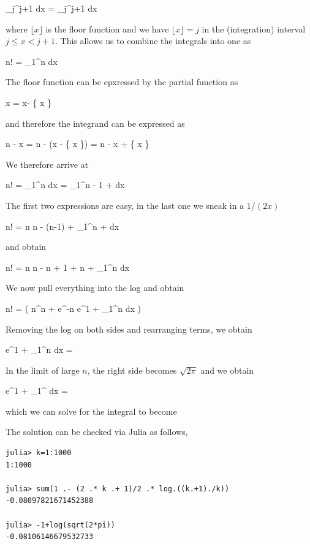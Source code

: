 \bee
\int_{j}^{j+1} dx = \int_{j}^{j+1} dx
\eee

where $\lfloor x \rfloor$ is the floor function and we have $\lfloor x \rfloor = j$ in the (integration) interval $j \leq x  < j+1$. This allows us to combine the integrals into one as

\bee
\log n! = \int_1^n dx
\eee

The floor function can be epxressed by the partial function as

\bee
\lfloor x \rfloor = x-  \{ x \}
\eee

and therefore the integrand can be expressed as

\bee
n - \lfloor x \rfloor = n - (x - \{ x \}) = n - x + \{ x \}
\eee

We therefore arrive at

\bee
\log n! = \int_1^n dx = \int_1^n  - 1 +  dx
\eee

The first two expressions are easy, in the last one we sneak in a $1/(2x)$

\bee
\log n! = n \log n - (n-1) + \int_1^n  +  dx
\eee

and obtain

\bee
\log n! = n \log n - n + 1 +  \log n + \int_1^n  dx
\eee

We now pull everything into the log and obtain

\bee
\log n! = \log \left( n^{n + } e^{-n} e^{1 + \int_1^n  dx} \right)
\eee

Removing the log on both sides and rearranging terms, we obtain

\bee
e^{1 + \int_1^n  dx} = 
\eee

In the limit of large $n$, the right side becomes $\sqrt{2\pi}$ and we obtain

\bee
e^{1 + \int_1^\infty {} dx} = \sqrt{2\pi}
\eee

which we can solve for the integral to become

\bee
{}
\eee
  

The solution can be checked via Julia as follows,

\begin{verbatim}
julia> k=1:1000
1:1000

julia> sum(1 .- (2 .* k .+ 1)/2 .* log.((k.+1)./k))
-0.08097821671452388

julia> -1+log(sqrt(2*pi))
-0.08106146679532733
\end{verbatim}

